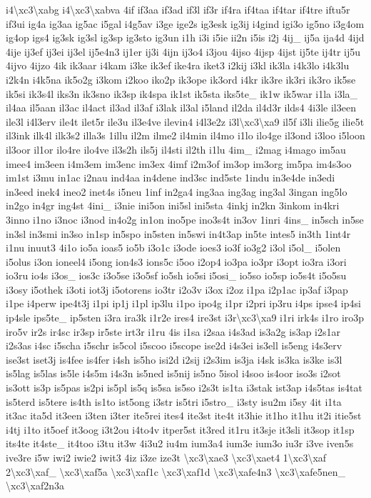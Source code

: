 {i4\textbackslash{}xc3\textbackslash{}xabg i4\textbackslash{}xc3\textbackslash{}xabva 4if if3aa if3ad if3l if3r if4ra if4taa if4tar if4tre iftu5r if3ui ig4a ig3aa ig5ac i5gal i4g5av i3ge ige2s ig3esk ig3ij i4gind igi3o ig5no i3g4om ig4op igs4 ig3sk ig3sl ig3sp ig3sto ig3un i1h i3i i5ie ii2n i5is i2j 4ij\-\_\- ij5a ija4d 4ijd 4ije ij3ef ij3ei ij3el ij5e4n3 ij1er ij3i 4ijn ij3o4 i3jou 4ijso 4ijsp 4ijst ij5te ij4tr ij5u 4ijvo 4ijzo 4ik ik3aar i4kam i3ke ik3ef ike4ra iket3 i2kij i3kl ik3la i4k3lo i4k3lu i2k4n i4k5na ik5o2g i3kom i2koo iko2p ik3ope ik3ord i4kr ik3re ik3ri ik3ro ik5se ik5si ik3s4l iks3n ik3sno ik3sp ik4spa ik1st ik5sta iks5te\-\_\- ik1w ik5war i1la i3la\-\_\- il4aa il5aan il3ac il4act il3ad il3af i3lak il3al i5land il2da il4d3r ilds4 4i3le il3een ile3l i4l3erv ile4t ilet5r ile3u il3e4ve ilevin4 i4l3e2z i3l\textbackslash{}xc3\textbackslash{}xa9 il5f i3li ilie5g ilie5t il3ink ilk4l ilk3s2 illa3s 1illu il2m ilme2 il4min il4mo i1lo ilo4ge il3ond i3loo i5loon il3oor il1or ilo4re ilo4ve il3s2h ils5j il4sti il2th i1lu 4im\-\_\- i2mag i4mago im5au imee4 im3een i4m3em im3enc im3ex 4imf i2m3of im3op im3org im5pa im4s3oo im1st i3mu in1ac i2nau ind4aa in4dene ind3sc ind5ste 1indu in3e4de in3edi in3eed inek4 ineo2 inet4s i5neu 1inf in2ga4 ing3aa ing3ag ing3al 3ingan ing5lo in2go in4gr ing4st 4ini\-\_\- i3nie ini5on ini5sl ini5sta 4inkj in2kn 3inkom in4kri 3inno i1no i3noc i3nod in4o2g in1on ino5pe ino3s4t in3ov 1inri 4ins\-\_\- in5sch in5se in3sl in3smi in3so in1sp in5spo in5sten in5swi in4t3ap in5te intes5 in3th 1int4r i1nu inuut3 4i1o io5a ioas5 io5b i3o1c i3ode ioes3 io3f io3g2 i3ol i5ol\-\_\- i5olen i5olus i3on ioneel4 i5ong ion4s3 ions5c i5oo i2op4 io3pa io3pr i3opt io3ra i3ori io3ru io4s i3os\-\_\- ios3c i3o5se i3o5sf io5sh io5si i5osi\-\_\- io5so io5sp io5s4t i5o5su i3osy i5othek i3oti iot3j i5otorens io3tr i2o3v i3ox i2oz i1pa i2p1ac ip3af i3pap i1pe i4perw ipe4t3j i1pi ip1j i1pl ip3lu i1po ipo4g i1pr i2pri ip3ru i4ps ipse4 ip4si ip4sle ips5te\-\_\- ip5sten i3ra ira3k i1r2e ires4 ire3st i3r\textbackslash{}xc3\textbackslash{}xa9 i1ri irk4s i1ro iro3p iro5v ir2s ir4sc ir3sp ir5ste irt3r i1ru 4is i1sa i2saa i4s3ad is3a2g is3ap i2s1ar i2s3as i4sc i5scha i5schr is5col i5scoo i5scope ise2d i4s3ei is3ell is5eng i4s3erv ise3st iset3j is4fee is4fer i4sh is5ho isi2d i2sij i2s3im is3ja i4sk is3ka is3ke is3l is5lag is5las is5le i4s5m i4s3n is5ned is5nij is5no 5isol i4soo is4oor iso3s i2sot is3ott is3p is5pas is2pi is5pl is5q is5sa is5so i2s3t is1ta i3stak ist3ap i4s5tas is4tat is5terd is5tere is4th is1to ist5ong i3str is5tri i5stro\-\_\- i3sty isu2m i5sy 4it i1ta it3ac ita5d it3een i3ten i3ter ite5rei ites4 ite3st ite4t it3hie it1ho it1hu it2i itie5st i4tj i1to it5oef it3oog i3t2ou i4to4v itper5st it3red it1ru it3sje it3sli it3sop it1sp its4te it4ste\-\_\- it4too i3tu it3w 4i3u2 iu4m ium3a4 ium3e ium3o iu3r i3ve iven5s ive3re i5w iwi2 iwie2 iwit3 4iz i3ze ize3t \textbackslash{}xc3\textbackslash{}xae3 \textbackslash{}xc3\textbackslash{}xaet4 1\textbackslash{}xc3\textbackslash{}xaf 2\textbackslash{}xc3\textbackslash{}xaf\-\_\- \textbackslash{}xc3\textbackslash{}xaf5a \textbackslash{}xc3\textbackslash{}xaf1c \textbackslash{}xc3\textbackslash{}xaf1d \textbackslash{}xc3\textbackslash{}xafe4n3 \textbackslash{}xc3\textbackslash{}xafe5nen\-\_\- \textbackslash{}xc3\textbackslash{}xaf2n3a }

